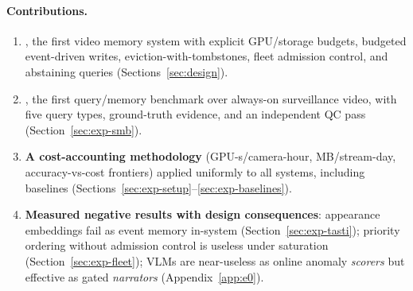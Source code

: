 \paragraph{Contributions.}
\begin{enumerate}
\item \textbf{\sys}, the first video memory system with explicit GPU/storage budgets, budgeted event-driven writes, eviction-with-tombstones, fleet admission control, and abstaining queries (Sections~\ref{sec:design}).
\item \textbf{\smb}, the first query/memory benchmark over always-on surveillance video, with five query types, ground-truth evidence, and an independent QC pass (Section~\ref{sec:exp-smb}).
\item \textbf{A cost-accounting methodology} (GPU-s/camera-hour, MB/stream-day, accuracy-vs-cost frontiers) applied uniformly to all systems, including baselines (Sections~\ref{sec:exp-setup}--\ref{sec:exp-baselines}).
\item \textbf{Measured negative results with design consequences}: appearance embeddings fail as event memory in-system (Section~\ref{sec:exp-tasti}); priority ordering without admission control is useless under saturation (Section~\ref{sec:exp-fleet}); VLMs are near-useless as online anomaly \emph{scorers} but effective as gated \emph{narrators} (Appendix~\ref{app:e0}).
\end{enumerate}
